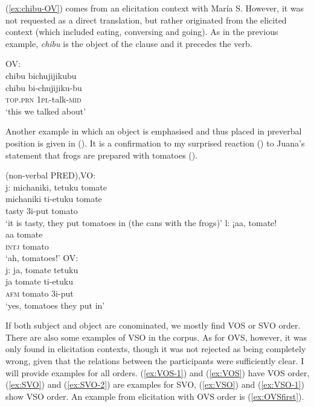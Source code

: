 (\ref{ex:chibu-OV}) comes from an elicitation context with María S. However, it was not requested as a direct translation, but rather originated from the elicited context (which included eating, conversing and going). As in the previous example, \textit{chibu} is the object of the clause and it precedes the verb.

\ea\label{ex:chibu-OV}
\begingl
\glpreamble  \textup{OV:}\\chibu bichujijikubu\\
\gla chibu bi-chujijiku-bu\\
\textsc{top.prn} 1\textsc{pl}-talk-\textsc{mid}\\
\glft ‘this we talked about’
\endgl
\trailingcitation{[rxx-e181020le]}
\xe


Another example in which an object is emphasised and thus placed in preverbal position is given in (). It is a confirmation to my surprised reaction () to Juana’s statement that frogs are prepared with tomatoes (). 

\ea\label{ex:tomato-OV}
  \ea\label{ex:tomato-OV.1}
 \begingl 
\glpreamble  \textup{(non-verbal PRED),VO:}\\\textup{j:} michaniki, tetuku tomate\\
\gla michaniki ti-etuku tomate\\ 
\glb tasty 3i-put tomato\\ 
\glft ‘it is tasty, they put tomatoes in (the cans with the frogs)’
  \ex\label{ex:tomato-OV.2}
 \begingl 
\glpreamble \textup{l:} ¡aa, tomate!\\
\gla aa tomate\\ 
\glb \textsc{intj} tomato\\ 
\glft ‘ah, tomatoes!’
  \ex\label{ex:tomato-OV.3}
 \begingl
\glpreamble  \textup{OV:}\\\textup{j:} ja, tomate tetuku\\
\gla ja tomate ti-etuku\\
\glb \textsc{afm} tomato 3i-put\\
\glft ‘yes, tomatoes they put in’
\endgl
\trailingcitation{[jxx-a120516l-a.468-470]}
\z
\xe


If both subject and object are conominated, we mostly find VOS or SVO order. There are also some examples of VSO in the corpus. As for OVS, however, it was only found in elicitation contexts, though it was not rejected as being completely wrong, given that the relations between the participants were sufficiently clear. I will provide examples for all orders. (\ref{ex:VOS-1}) and (\ref{ex:VOS}) have VOS order, (\ref{ex:SVO}) and (\ref{ex:SVO-2}) are examples for SVO, (\ref{ex:VSO}) and (\ref{ex:VSO-1}) show VSO order. An example from elicitation with OVS order is (\ref{ex:OVSfirst}).


